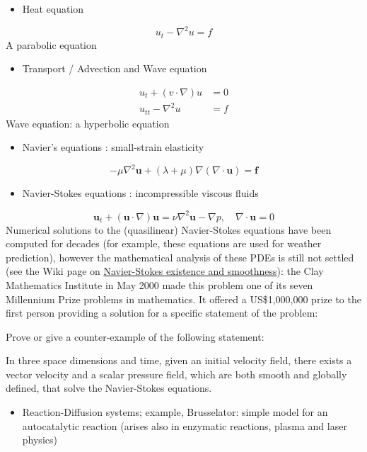 \documentclass[12pt,a4paper]{article}
\begin{document}
\begin{itemize}
\item Heat equation

\end{itemize}
\[
 u_t - \nabla^2 u = f 
\]
A parabolic equation

\begin{itemize}
\item Transport / Advection and Wave equation 

\end{itemize}

\begin{align*}
    u_t + (v \cdot \nabla) u &= 0 \\
  u_{tt} - \nabla^2 u &= f 
\end{align*}
Wave equation: a hyperbolic equation

\begin{itemize}
\item Navier's equations : small-strain elasticity 

\end{itemize}
\[
- \mu \nabla^2 \mathbf{u} + (\lambda+\mu) \nabla  (\nabla\cdot\mathbf{u}) = \mathbf{f}
\]
\begin{itemize}
\item Navier-Stokes equations : incompressible viscous fluids 

\end{itemize}
\[
\mathbf{u}_t + (\mathbf{u} \cdot \nabla)\mathbf{u} = \nu \nabla^2 \mathbf{u} - \nabla p, \quad \nabla \cdot \mathbf{u} = 0
\]
Numerical solutions to the (quasilinear) Navier-Stokes equations have been computed for decades (for example, these equations are used for weather prediction), however the mathematical analysis of these PDEs is still not settled (see the Wiki page on \href{https://en.wikipedia.org/wiki/Navier%E2%80%93Stokes_existence_and_smoothness}{Navier-Stokes existence and smoothness}): the Clay Mathematics Institute in May 2000 made this problem one of its seven Millennium Prize problems in mathematics. It offered a US\$1,000,000 prize to the first person providing a solution for a specific statement of the problem:

Prove or give a counter-example of the following statement:

In three space dimensions and time, given an initial velocity field, there exists a vector velocity and a scalar pressure field, which are both smooth and globally defined, that solve the Navier-Stokes equations.

\begin{itemize}
\item Reaction-Diffusion systems; example, Brusselator: simple model for an autocatalytic reaction (arises also in enzymatic reactions, plasma and laser physics)

\end{itemize}
\end{document}
